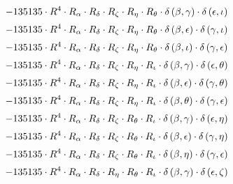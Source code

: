 \begin{subequations}
\begin{gather}
 \\[0.2em] \notag 		 - 135135 \cdot R^{4} \cdot R_{\alpha{}} \cdot R_{\delta{}} \cdot R_{\zeta{}} \cdot R_{\eta{}} \cdot R_{\theta{}} \cdot \delta{}\left(\beta{}, \gamma{}\right) \cdot \delta{}\left(\epsilon{}, \iota{}\right) 
 \\[0.2em] \notag 		 - 135135 \cdot R^{4} \cdot R_{\alpha{}} \cdot R_{\delta{}} \cdot R_{\zeta{}} \cdot R_{\eta{}} \cdot R_{\theta{}} \cdot \delta{}\left(\beta{}, \epsilon{}\right) \cdot \delta{}\left(\gamma{}, \iota{}\right) 
 \\[0.2em] \notag 		 - 135135 \cdot R^{4} \cdot R_{\alpha{}} \cdot R_{\delta{}} \cdot R_{\zeta{}} \cdot R_{\eta{}} \cdot R_{\theta{}} \cdot \delta{}\left(\beta{}, \iota{}\right) \cdot \delta{}\left(\gamma{}, \epsilon{}\right) 
 \\[0.2em] \notag 		 - 135135 \cdot R^{4} \cdot R_{\alpha{}} \cdot R_{\delta{}} \cdot R_{\zeta{}} \cdot R_{\eta{}} \cdot R_{\iota{}} \cdot \delta{}\left(\beta{}, \gamma{}\right) \cdot \delta{}\left(\epsilon{}, \theta{}\right) 
 \\[0.2em] \notag 		 - 135135 \cdot R^{4} \cdot R_{\alpha{}} \cdot R_{\delta{}} \cdot R_{\zeta{}} \cdot R_{\eta{}} \cdot R_{\iota{}} \cdot \delta{}\left(\beta{}, \epsilon{}\right) \cdot \delta{}\left(\gamma{}, \theta{}\right) 
 \\[0.2em] \notag 		 - 135135 \cdot R^{4} \cdot R_{\alpha{}} \cdot R_{\delta{}} \cdot R_{\zeta{}} \cdot R_{\eta{}} \cdot R_{\iota{}} \cdot \delta{}\left(\beta{}, \theta{}\right) \cdot \delta{}\left(\gamma{}, \epsilon{}\right) 
 \\[0.2em] \notag 		 - 135135 \cdot R^{4} \cdot R_{\alpha{}} \cdot R_{\delta{}} \cdot R_{\zeta{}} \cdot R_{\theta{}} \cdot R_{\iota{}} \cdot \delta{}\left(\beta{}, \gamma{}\right) \cdot \delta{}\left(\epsilon{}, \eta{}\right) 
 \\[0.2em] \notag 		 - 135135 \cdot R^{4} \cdot R_{\alpha{}} \cdot R_{\delta{}} \cdot R_{\zeta{}} \cdot R_{\theta{}} \cdot R_{\iota{}} \cdot \delta{}\left(\beta{}, \epsilon{}\right) \cdot \delta{}\left(\gamma{}, \eta{}\right) 
 \\[0.2em] \notag 		 - 135135 \cdot R^{4} \cdot R_{\alpha{}} \cdot R_{\delta{}} \cdot R_{\zeta{}} \cdot R_{\theta{}} \cdot R_{\iota{}} \cdot \delta{}\left(\beta{}, \eta{}\right) \cdot \delta{}\left(\gamma{}, \epsilon{}\right) 
 \\[0.2em] \notag 		 - 135135 \cdot R^{4} \cdot R_{\alpha{}} \cdot R_{\delta{}} \cdot R_{\eta{}} \cdot R_{\theta{}} \cdot R_{\iota{}} \cdot \delta{}\left(\beta{}, \gamma{}\right) \cdot \delta{}\left(\epsilon{}, \zeta{}\right) 

\end{gather}
\end{subequations}
